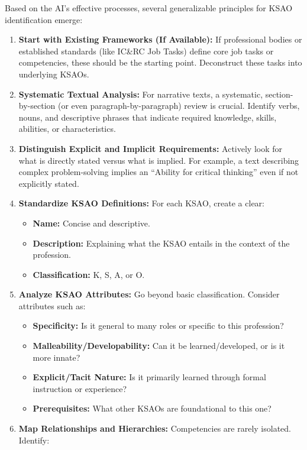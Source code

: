 \documentclass[
  letterpaper,
  DIV=11,
  numbers=noendperiod]{scrartcl}
\providecommand{\tightlist}{%
  \setlength{\itemsep}{0pt}\setlength{\parskip}{0pt}}
\begin{document}
Based on the AI's effective processes, several generalizable principles
for KSAO identification emerge:

\begin{enumerate}
\def\labelenumi{\arabic{enumi}.}
\tightlist
\item
  \textbf{Start with Existing Frameworks (If Available):} If
  professional bodies or established standards (like IC\&RC Job Tasks)
  define core job tasks or competencies, these should be the starting
  point. Deconstruct these tasks into underlying KSAOs.
\item
  \textbf{Systematic Textual Analysis:} For narrative texts, a
  systematic, section-by-section (or even paragraph-by-paragraph) review
  is crucial. Identify verbs, nouns, and descriptive phrases that
  indicate required knowledge, skills, abilities, or characteristics.
\item
  \textbf{Distinguish Explicit and Implicit Requirements:} Actively look
  for what is directly stated versus what is implied. For example, a
  text describing complex problem-solving implies an ``Ability for
  critical thinking'' even if not explicitly stated.
\item
  \textbf{Standardize KSAO Definitions:} For each KSAO, create a clear:

  \begin{itemize}
  \tightlist
  \item
    \textbf{Name:} Concise and descriptive.
  \item
    \textbf{Description:} Explaining what the KSAO entails in the
    context of the profession.
  \item
    \textbf{Classification:} K, S, A, or O.
  \end{itemize}
\item
  \textbf{Analyze KSAO Attributes:} Go beyond basic classification.
  Consider attributes such as:

  \begin{itemize}
  \tightlist
  \item
    \textbf{Specificity:} Is it general to many roles or specific to
    this profession?
  \item
    \textbf{Malleability/Developability:} Can it be learned/developed,
    or is it more innate?
  \item
    \textbf{Explicit/Tacit Nature:} Is it primarily learned through
    formal instruction or experience?
  \item
    \textbf{Prerequisites:} What other KSAOs are foundational to this
    one?
  \end{itemize}
\item
  \textbf{Map Relationships and Hierarchies:} Competencies are rarely
  isolated. Identify:


\end{enumerate}
\end{document}
